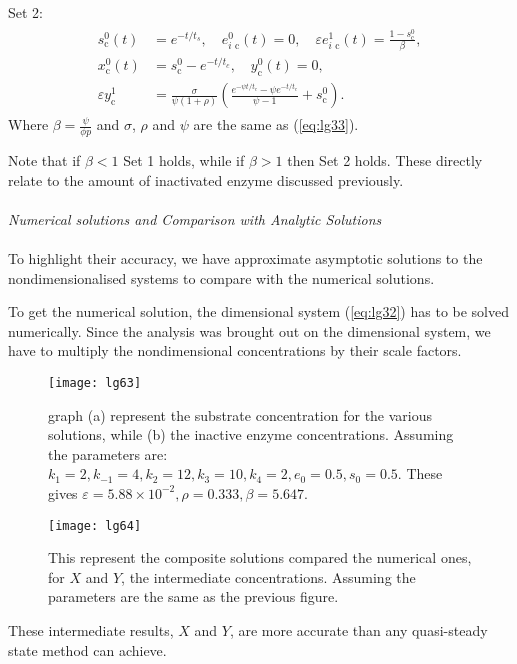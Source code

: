 \documentclass[a4paper]{report}
\theoremstyle{definition}
\begin{document}
Set 2:
\begin{align}
\begin{split}
s_{\text{c}}^0(t)&=e^{-t/t_s}, \quad e_{i \text{ c}}^0(t)=0, \quad \varepsilon e_{i \text{ c}}^1(t)=\frac{1-s_{\text{c}}^0}{\beta}, \\
x_{\text{c}}^0(t)&=s_{\text{c}}^0-e^{-t/t_c}, \quad y_{\text{c}}^0(t)=0, \\
\varepsilon y_{\text{c}}^1&=\frac{\sigma}{\psi(1+\rho)}\left(\frac{e^{-\psi t/t_c}-\psi e^{-t/t_c}}{\psi -1}+s_{\text{c}}^0\right).
\end{split}
\end{align}
Where $\beta=\frac{\psi}{\phi p}$ and $\sigma$, $\rho$ and $\psi$ are the same as (\ref{eq:lg33}).

Note that if $\beta<1$ Set 1 holds, while if $\beta>1$ then Set 2 holds. These directly relate to the amount of inactivated enzyme discussed previously.
\\
\\
\textit{Numerical solutions and Comparison with Analytic Solutions}
\\
\\
To highlight their accuracy, we have approximate asymptotic solutions to the nondimensionalised systems to compare with the numerical solutions.

To get the numerical solution, the dimensional system (\ref{eq:lg32}) has to be solved numerically. Since the analysis was brought out on the dimensional system, we have to multiply the nondimensional concentrations by their scale factors.

\begin{figure}[h]
\texttt{[image: lg63]}
\label{fig:lg63}
\caption{graph (a) represent the substrate concentration for the various solutions, while (b) the inactive enzyme concentrations. Assuming the parameters are: $k_1=2, k_{-1}=4, k_2=12, k_3=10, k_4=2, e_0=0.5, s_0=0.5$. These gives $\varepsilon=5.88\times 10^{-2}, \rho=0.333, \beta=5.647$.}
\end{figure}

\begin{figure}[h]
\texttt{[image: lg64]}
\label{fig:lg64}
\caption{This represent the composite solutions compared the numerical ones, for $X$ and $Y$, the intermediate concentrations. Assuming the parameters are the same as the previous figure.}
\end{figure}

These intermediate results, $X$ and $Y$, are more accurate than any quasi-steady state method can achieve. 
\end{document}
